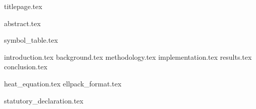 \documentclass[11pt,fleqn,twoside,ngerman]{article}
\begin{document}
  {titlepage.tex}

  \setcounter{page}{0}

  \cleardoublepage
  {abstract.tex}

  \tableofcontents

  \listoffigures

  {symbol_table.tex}

  \cleardoublepage
  {introduction.tex}
  {background.tex}
  {methodology.tex}
  {implementation.tex}
  {results.tex}
  {conclusion.tex}

  \nocite{*}
  
  

  \cleardoublepage
  \appendix
  {heat_equation.tex}
  {ellpack_format.tex}

  \cleardoublepage
  {statutory_declaration.tex}
\end{document}
